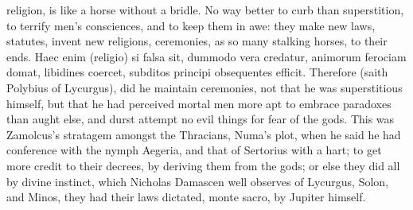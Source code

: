 {religion, is like a horse without a bridle. No way better to curb than
superstition, to terrify men's consciences, and to keep them in awe:
they make new laws, statutes, invent new religions, ceremonies, as so
many stalking horses, to their ends. Haec enim (religio) si falsa
sit, dummodo vera credatur, animorum ferociam domat, libidines coercet,
subditos principi obsequentes efficit. Therefore (saith
Polybius of Lycurgus), did he maintain ceremonies, not that he
was superstitious himself, but that he had perceived mortal men more
apt to embrace paradoxes than aught else, and durst attempt no evil
things for fear of the gods. This was Zamolcus's stratagem amongst the
Thracians, Numa's plot, when he said he had conference with the nymph
Aegeria, and that of Sertorius with a hart; to get more credit to their
decrees, by deriving them from the gods; or else they did all by divine
instinct, which Nicholas Damascen well observes of Lycurgus, Solon, and
Minos, they had their laws dictated, monte sacro, by Jupiter himself.

}
